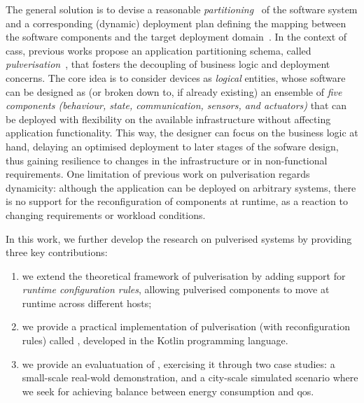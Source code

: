 \documentclass[conference]{IEEEtran}
\newcommand{\meta}[1]{{\color{blue}#1}}
\begin{document}
The general solution is to devise 
 a reasonable \emph{partitioning}~\cite{DBLP:journals/jnca/LiuASGBQ15} of the software system
 and a corresponding (dynamic) deployment plan 
 defining the mapping between the software components and the target deployment domain~\cite{DBLP:journals/jss/ArcangeliBL15}.
%
In the context of \acp{cas},
 previous works propose an application partitioning schema,
 called \emph{pulverisation}~\cite{FI2020-pulverization},
 that fosters the decoupling of business logic and deployment concerns.
%
The core idea is to consider devices as \emph{logical} entities,
whose software can be designed as (or broken down to, if already existing) an ensemble of \emph{five components
(behaviour, state, communication, sensors, and actuators)}
 that can be deployed with flexibility on the available infrastructure without affecting application functionality. %
%
This way, the designer can focus on the business logic at hand,
delaying an optimised deployment to later stages of the sofware design,
thus gaining resilience to changes in the infrastructure or in non-functional requirements.
%
One limitation of previous work on pulverisation regards dynamicity:
although the application can be deployed on arbitrary systems,
there is no support for the reconfiguration of components at runtime, as a reaction to changing requirements or workload conditions.

In this work,
we further develop the research on pulverised systems by providing three key contributions:
%
\begin{enumerate}[label=\it{(\roman*)}]
 \item we extend the theoretical framework of pulverisation by adding support for
\emph{runtime configuration rules}, allowing pulverised components to move at runtime across different hosts;
 \item we provide a practical implementation of pulverisation (with reconfiguration rules) called \emph{\ourframework{}}, developed in the Kotlin programming language.
 \item we provide an evaluatuation of \ourframework{}, exercising it through two case studies:
a small-scale real-wold demonstration, and a city-scale simulated scenario where we seek for achieving balance between energy consumption and \ac{qos}.
\end{enumerate}

\end{document}
